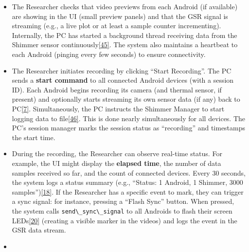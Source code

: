 \documentclass[12pt,a4paper]{article}
\begin{document}
\begin{itemize}
\item
  The Researcher checks that video previews from each Android (if available) are showing in the UI (small preview panels) and that the GSR signal is streaming (e.g., a live plot or at least a sample counter incrementing). Internally, the PC has started a background thread receiving data from the Shimmer sensor continuously\href{https://github.com/buccancs/bucika_gsr/blob/7048f7f6a7536f5cd577ed2184800d3dad97fd08/PythonApp/shimmer_pc_app.py\#L191-L200}{{[}45{]}}. The system also maintains a heartbeat to each Android (pinging every few seconds) to ensure connectivity.
\item
  The Researcher initiates recording by clicking ``Start Recording''. The PC sends a \textbf{start command} to all connected Android devices (with a session ID). Each Android begins recording its camera (and thermal sensor, if present) and optionally starts streaming its own sensor data (if any) back to PC\href{https://github.com/buccancs/bucika_gsr/blob/7048f7f6a7536f5cd577ed2184800d3dad97fd08/PythonApp/shimmer_pc_app.py\#L120-L128}{{[}7{]}}. Simultaneously, the PC instructs the Shimmer Manager to start logging data to file\href{https://github.com/buccancs/bucika_gsr/blob/7048f7f6a7536f5cd577ed2184800d3dad97fd08/PythonApp/shimmer_pc_app.py\#L130-L138}{{[}46{]}}. This is done nearly simultaneously for all devices. The PC's session manager marks the session status as ``recording'' and timestamps the start time.
\item
  During the recording, the Researcher can observe real-time status. For example, the UI might display the \textbf{elapsed time}, the number of data samples received so far, and the count of connected devices. Every 30 seconds, the system logs a status summary (e.g., ``Status: 1 Android, 1 Shimmer, 3000 samples'')\href{https://github.com/buccancs/bucika_gsr/blob/7048f7f6a7536f5cd577ed2184800d3dad97fd08/PythonApp/shimmer_pc_app.py\#L260-L267}{{[}18{]}}. If the Researcher has a specific event to mark, they can trigger a sync signal: for instance, pressing a ``Flash Sync'' button. When pressed, the system calls \passthrough{\lstinline!send\_sync\_signal!} to all Androids to flash their screen LEDs\href{https://github.com/buccancs/bucika_gsr/blob/7048f7f6a7536f5cd577ed2184800d3dad97fd08/PythonApp/shimmer_pc_app.py\#L170-L173}{{[}20{]}} (creating a visible marker in the videos) and logs the event in the GSR data stream.
\item

\end{itemize}
\end{document}

